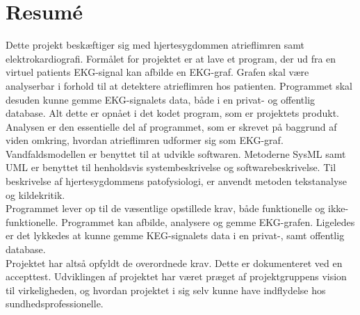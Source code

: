 \chapter{Resumé}

Dette projekt beskæftiger sig med hjertesygdommen atrieflimren samt elektrokardiografi. Formålet for projektet er at lave et program, der ud fra en virtuel patients EKG-signal kan afbilde en EKG-graf. Grafen skal være analyserbar i forhold til at detektere atrieflimren hos patienten. Programmet skal desuden kunne gemme EKG-signalets data, både i en privat- og offentlig database. Alt dette er opnået i det kodet program, som er projektets produkt. Analysen er den essentielle del af programmet, som er skrevet på baggrund af viden omkring, hvordan atrieflimren udformer sig som EKG-graf.\\
Vandfaldsmodellen er benyttet til at udvikle softwaren. Metoderne SysML samt UML er benyttet til henholdsvis systembeskrivelse og softwarebeskrivelse. Til beskrivelse af hjertesygdommens patofysiologi, er anvendt metoden tekstanalyse og kildekritik.\\
Programmet lever op til de væsentlige opstillede krav, både funktionelle og ikke-funktionelle. Programmet kan afbilde, analysere og gemme EKG-grafen. Ligeledes er det lykkedes at kunne gemme KEG-signalets data i en privat-, samt offentlig database.\\  
Projektet har altså opfyldt de overordnede krav. Dette er dokumenteret ved en accepttest. Udviklingen af projektet har været præget af projektgruppens vision til virkeligheden, og hvordan projektet i sig selv kunne have indflydelse hos sundhedsprofessionelle.\\
